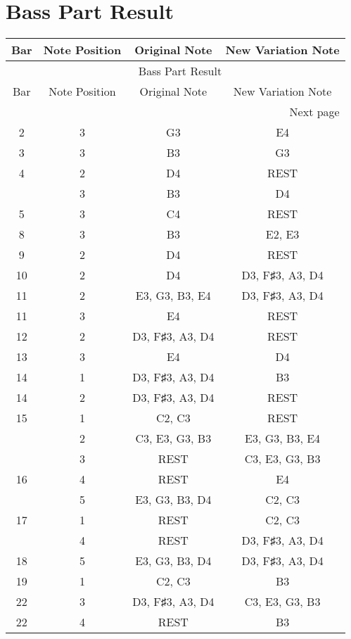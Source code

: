 \documentclass{article}
\begin{document}
\section*{Bass Part Result}
\begin{longtable}{|c|c|c|c|}
\hline
Bar & Note Position & Original Note & New Variation Note \\ \hline
\endfirsthead
\multicolumn{4}{c}{{\tablename\ \thetable{} Bass Part Result}} \\
\hline
Bar & Note Position & Original Note & New Variation Note \\ \hline
\hline
\endhead
\hline
\multicolumn{4}{r}{Next page}
\endfoot
\hline
\endlastfoot
1 & 4 & G3 & G1 \\ 
\hline
2 & 3 & G3 & E4 \\ 
\hline
3 & 3 & B3 & G3 \\ 
\hline
4 & 2 & D4 & REST \\ 
  & 3 & B3 & D4 \\ 
\hline
5 & 3 & C4 & REST \\ 
\hline
8 & 3 & B3 & E2, E3 \\ 
\hline
9 & 2 & D4 & REST \\ 
\hline
10 & 2 & D4 & D3, F♯3, A3, D4 \\ 
\hline
11 & 2 & E3, G3, B3, E4 & D3, F♯3, A3, D4 \\ 
\hline
11 & 3 & E4 & REST \\ 
\hline
12 & 2 & D3, F♯3, A3, D4 & REST \\ 
\hline
13 & 3 & E4 & D4 \\ 
\hline
14 & 1 & D3, F♯3, A3, D4 & B3 \\ 
\hline
14 & 2 & D3, F♯3, A3, D4 & REST \\ 
\hline
15 & 1 & C2, C3 & REST \\ 
  & 2 & C3, E3, G3, B3 & E3, G3, B3, E4 \\ 
  & 3 & REST & C3, E3, G3, B3 \\ 
\hline
16 & 4 & REST & E4 \\ 
  & 5 & E3, G3, B3, D4 & C2, C3 \\ 
\hline
17 & 1 & REST & C2, C3 \\ 
  & 4 & REST & D3, F♯3, A3, D4 \\ 
\hline
18 & 5 & E3, G3, B3, D4 & D3, F♯3, A3, D4 \\ 
\hline
19 & 1 & C2, C3 & B3 \\ 
\hline
22 & 3 & D3, F♯3, A3, D4 & C3, E3, G3, B3 \\ 
\hline
22 & 4 & REST & B3 \\ 

\end{longtable}
\end{document}
